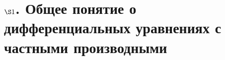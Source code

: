 \documentclass[../main.tex]{subfiles}
\begin{document}
\section*{$\S 1$.  Общее понятие о дифференциальных уравнениях с частными производными}
\end{document}
